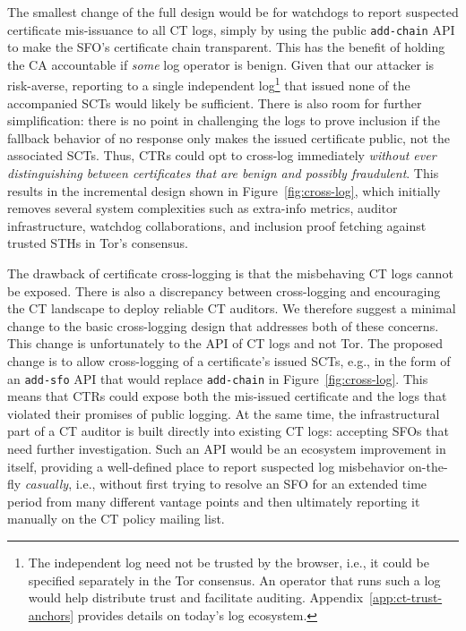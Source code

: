 The smallest change of the full design would be for watchdogs to report
suspected certificate mis-issuance to all CT logs, simply by using the public
\texttt{add-chain} API to make the SFO's certificate chain transparent.  This
has the benefit of holding the CA accountable if \emph{some} log operator is
benign.  Given that our attacker is risk-averse, reporting to a single
independent log\footnote{The independent log need not be trusted by the browser,
i.e., it could be specified separately in the Tor consensus.  An operator that
runs such a log would help distribute trust and facilitate auditing.
Appendix~\ref{app:ct-trust-anchors} provides details on today's log ecosystem.}
that issued none of the accompanied SCTs would likely be sufficient.  There is
also room for further simplification: there is no point in challenging the logs
to prove inclusion if the fallback behavior of no response only makes the issued
certificate public, not the associated SCTs. Thus, CTRs could opt to cross-log
immediately \emph{without ever distinguishing between certificates that are
benign and possibly fraudulent}.  This results in the incremental design shown
in Figure~\ref{fig:cross-log}, which initially removes several system
complexities such as extra-info metrics, auditor infrastructure, watchdog
collaborations, and inclusion proof fetching against trusted STHs in Tor's
consensus.

The drawback of certificate cross-logging is that the misbehaving CT logs cannot
be exposed.  There is also a discrepancy between cross-logging and encouraging
the CT landscape to deploy reliable CT auditors.  We therefore suggest a
minimal change to the basic cross-logging design that addresses both of these
concerns.  This change is unfortunately to the API of CT logs and not Tor.  The
proposed change is to allow cross-logging of a certificate's issued SCTs, e.g.,
in the form of an \texttt{add-sfo} API that would replace \texttt{add-chain}
in Figure~\ref{fig:cross-log}.
This means that CTRs could expose both the mis-issued certificate and the logs
that violated their promises of public logging.  At the same time, the
infrastructural part of a CT auditor is built directly into existing
CT logs:
	accepting SFOs that need further investigation.
Such an API would be an ecosystem improvement in itself, providing a
well-defined place to report suspected log misbehavior on-the-fly
\emph{casually}, i.e., without first trying to resolve an SFO for an extended
time period from many different vantage points and then ultimately reporting it
manually on the CT policy mailing list.

